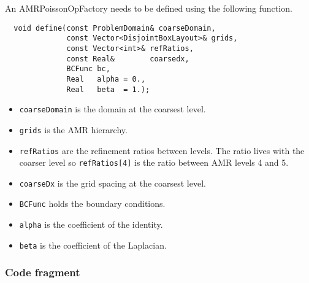 An AMRPoissonOpFactory needs to be defined using the following 
function.
\begin{verbatim}
  void define(const ProblemDomain& coarseDomain,
              const Vector<DisjointBoxLayout>& grids,
              const Vector<int>& refRatios,
              const Real&        coarsedx,
              BCFunc bc,
              Real   alpha = 0.,
              Real   beta  = 1.);

\end{verbatim}
\begin{itemize}
  \item  {\tt  coarseDomain} is the domain at the coarsest level.
  \item  {\tt  grids} is the AMR  hierarchy.
  \item  {\tt  refRatios} are the refinement ratios between levels.
    The ratio lives with the coarser level    so {\tt refRatios[4]} is
    the ratio between  AMR levels 4 and 5.
  \item  {\tt  coarseDx} is the grid spacing at the coarsest level.
  \item {\tt BCFunc} holds the boundary conditions.
  \item {\tt alpha} is the coefficient of the identity.
  \item {\tt beta} is the coefficient of the Laplacian.
\end{itemize}
  
\subsubsection{Code fragment}

